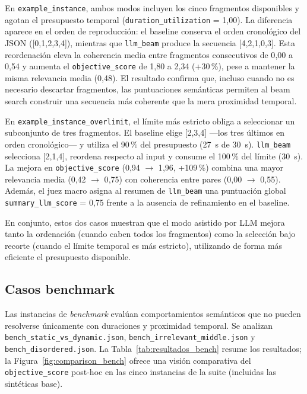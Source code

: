 \documentclass[12pt,a4paper]{article}
\begin{document}
En \texttt{example\_instance}, ambos modos incluyen los cinco fragmentos disponibles y agotan el presupuesto temporal (\texttt{duration\_utilization} = 1{,}00). La diferencia aparece en el orden de reproducción: el baseline conserva el orden cronológico del JSON ([0,1,2,3,4]), mientras que \texttt{llm\_beam} produce la secuencia [4,2,1,0,3]. Esta reordenación eleva la coherencia media entre fragmentos consecutivos de 0{,}00 a 0{,}54 y aumenta el \texttt{objective\_score} de 1{,}80 a 2{,}34 (+30\,\%), pese a mantener la misma relevancia media (0{,}48). El resultado confirma que, incluso cuando no es necesario descartar fragmentos, las puntuaciones semánticas permiten al beam search construir una secuencia más coherente que la mera proximidad temporal.

En \texttt{example\_instance\_overlimit}, el límite más estricto obliga a seleccionar un subconjunto de tres fragmentos. El baseline elige [2,3,4] ---los tres últimos en orden cronológico--- y utiliza el 90\,\% del presupuesto (27~s de 30~s). \texttt{llm\_beam} selecciona [2,1,4], reordena respecto al input y consume el 100\,\% del límite (30~s). La mejora en \texttt{objective\_score} (0{,}94 $\rightarrow$ 1{,}96, +109\,\%) combina una mayor relevancia media (0{,}42 $\rightarrow$ 0{,}75) con coherencia entre pares (0{,}00 $\rightarrow$ 0{,}55). Además, el juez macro asigna al resumen de \texttt{llm\_beam} una puntuación global \texttt{summary\_llm\_score} = 0{,}75 frente a la ausencia de refinamiento en el baseline.

En conjunto, estos dos casos muestran que el modo asistido por LLM mejora tanto la ordenación (cuando caben todos los fragmentos) como la selección bajo recorte (cuando el límite temporal es más estricto), utilizando de forma más eficiente el presupuesto disponible.


\subsection{Casos benchmark}

Las instancias de \textit{benchmark} evalúan comportamientos semánticos que no pueden resolverse únicamente con duraciones y proximidad temporal. Se analizan \linebreak \texttt{bench\_static\_vs\_dynamic.json}, \texttt{bench\_irrelevant\_middle.json} y \linebreak \texttt{bench\_disordered.json}. La Tabla~\ref{tab:resultados_bench} resume los resultados; la Figura~\ref{fig:comparison_bench} ofrece una visión comparativa del \texttt{objective\_score} post-hoc en las cinco instancias de la suite (incluidas las sintéticas base).
\end{document}
